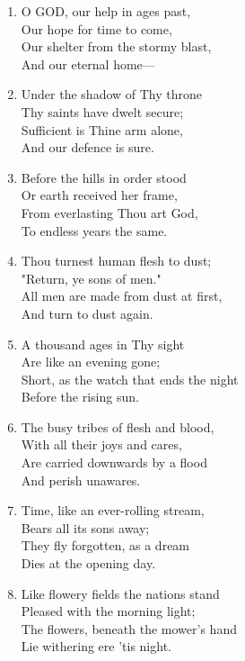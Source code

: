 \documentclass[11pt,a4paper]{article}
\begin{document}
\begin{enumerate}
    \item O GOD, our help in ages past, \\
        Our hope for time to come, \\
        Our shelter from the stormy blast, \\
        And our eternal home---

    \item Under the shadow of Thy throne \\
        Thy saints have dwelt secure; \\
        Sufficient is Thine arm alone, \\
        And our defence is sure.

    \item Before the hills in order stood \\
        Or earth received her frame, \\
        From everlasting Thou art God, \\
        To endless years the same.

    \item Thou turnest human flesh to dust; \\
        "Return, ye sons of men." \\
        All men are made from dust at first, \\
        And turn to dust again.

    \item A thousand ages in Thy sight \\
        Are like an evening gone; \\
        Short, as the watch that ends the night \\
        Before the rising sun.

    \item The busy tribes of flesh and blood, \\
        With all their joys and cares, \\
        Are carried downwards by a flood \\
        And perish unawares.

    \item Time, like an ever-rolling stream, \\
        Bears all its sons away; \\
        They fly forgotten, as a dream \\
        Dies at the opening day.

    \item Like flowery fields the nations stand \\
        Pleased with the morning light; \\
        The flowers, beneath the mower's hand \\
        Lie withering ere 'tis night.


\end{enumerate}
\end{document}
